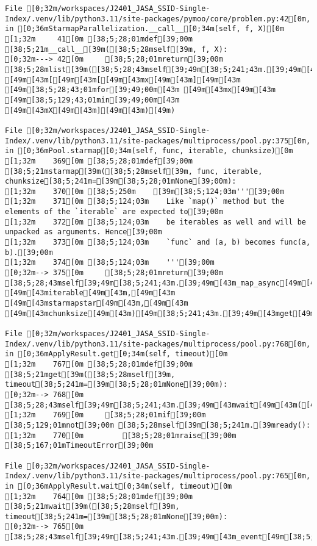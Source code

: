 \documentclass[
  letterpaper,
  DIV=11,
  numbers=noendperiod]{scrartcl}
\begin{document}
\begin{verbatim}
File [0;32m/workspaces/J2401_JASA_SSID-Single-Index/.venv/lib/python3.11/site-packages/pymoo/core/problem.py:42[0m, in [0;36mStarmapParallelization.__call__[0;34m(self, f, X)[0m
[1;32m     41[0m [38;5;28;01mdef[39;00m [38;5;21m__call__[39m([38;5;28mself[39m, f, X):
[0;32m---> 42[0m     [38;5;28;01mreturn[39;00m [38;5;28mlist[39m([38;5;28;43mself[39;49m[38;5;241;43m.[39;49m[43mstarmap[49m[43m([49m[43mf[49m[43m,[49m[43m [49m[43m[[49m[43m[[49m[43mx[49m[43m][49m[43m [49m[38;5;28;43;01mfor[39;49;00m[43m [49m[43mx[49m[43m [49m[38;5;129;43;01min[39;49;00m[43m [49m[43mX[49m[43m][49m[43m)[49m)

File [0;32m/workspaces/J2401_JASA_SSID-Single-Index/.venv/lib/python3.11/site-packages/multiprocess/pool.py:375[0m, in [0;36mPool.starmap[0;34m(self, func, iterable, chunksize)[0m
[1;32m    369[0m [38;5;28;01mdef[39;00m [38;5;21mstarmap[39m([38;5;28mself[39m, func, iterable, chunksize[38;5;241m=[39m[38;5;28;01mNone[39;00m):
[1;32m    370[0m [38;5;250m    [39m[38;5;124;03m'''[39;00m
[1;32m    371[0m [38;5;124;03m    Like `map()` method but the elements of the `iterable` are expected to[39;00m
[1;32m    372[0m [38;5;124;03m    be iterables as well and will be unpacked as arguments. Hence[39;00m
[1;32m    373[0m [38;5;124;03m    `func` and (a, b) becomes func(a, b).[39;00m
[1;32m    374[0m [38;5;124;03m    '''[39;00m
[0;32m--> 375[0m     [38;5;28;01mreturn[39;00m [38;5;28;43mself[39;49m[38;5;241;43m.[39;49m[43m_map_async[49m[43m([49m[43mfunc[49m[43m,[49m[43m [49m[43miterable[49m[43m,[49m[43m [49m[43mstarmapstar[49m[43m,[49m[43m [49m[43mchunksize[49m[43m)[49m[38;5;241;43m.[39;49m[43mget[49m[43m([49m[43m)[49m

File [0;32m/workspaces/J2401_JASA_SSID-Single-Index/.venv/lib/python3.11/site-packages/multiprocess/pool.py:768[0m, in [0;36mApplyResult.get[0;34m(self, timeout)[0m
[1;32m    767[0m [38;5;28;01mdef[39;00m [38;5;21mget[39m([38;5;28mself[39m, timeout[38;5;241m=[39m[38;5;28;01mNone[39;00m):
[0;32m--> 768[0m     [38;5;28;43mself[39;49m[38;5;241;43m.[39;49m[43mwait[49m[43m([49m[43mtimeout[49m[43m)[49m
[1;32m    769[0m     [38;5;28;01mif[39;00m [38;5;129;01mnot[39;00m [38;5;28mself[39m[38;5;241m.[39mready():
[1;32m    770[0m         [38;5;28;01mraise[39;00m [38;5;167;01mTimeoutError[39;00m

File [0;32m/workspaces/J2401_JASA_SSID-Single-Index/.venv/lib/python3.11/site-packages/multiprocess/pool.py:765[0m, in [0;36mApplyResult.wait[0;34m(self, timeout)[0m
[1;32m    764[0m [38;5;28;01mdef[39;00m [38;5;21mwait[39m([38;5;28mself[39m, timeout[38;5;241m=[39m[38;5;28;01mNone[39;00m):
[0;32m--> 765[0m     [38;5;28;43mself[39;49m[38;5;241;43m.[39;49m[43m_event[49m[38;5;241;43m.[39;49m[43mwait[49m[43m([49m[43mtimeout[49m[43m)[49m


\end{verbatim}
\end{document}
